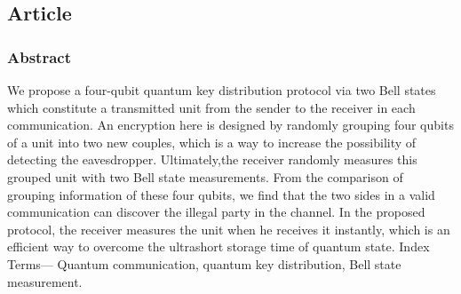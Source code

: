 \subsection{Article}

\subsubsection*{Abstract}

We propose a four-qubit quantum key distribution protocol via two Bell states which constitute a transmitted unit from the sender to the receiver in each communication.
An encryption here is designed by randomly grouping four qubits of a unit into two new couples, which is a way to increase the possibility of detecting the eavesdropper. Ultimately,the receiver randomly measures this grouped unit with two Bell state measurements. From the comparison of grouping information of these four qubits, we find that the two sides in a valid communication can discover the illegal party in the channel. In the proposed protocol, the receiver measures the unit when he receives it instantly, which is an efficient way to overcome the ultrashort storage time of quantum state.
Index Terms— Quantum communication, quantum key distribution, Bell state measurement.

